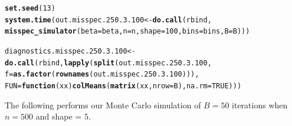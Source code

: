 \documentclass[11pt]{article}\usepackage[]{graphicx}\usepackage[]{color}
\makeatletter
\newcommand{\hlnum}[1]{\textcolor[rgb]{0.686,0.059,0.569}{#1}}%
\newcommand{\hlstd}[1]{\textcolor[rgb]{0.345,0.345,0.345}{#1}}%
\newcommand{\hlkwa}[1]{\textcolor[rgb]{0.161,0.373,0.58}{\textbf{#1}}}%
\newcommand{\hlkwb}[1]{\textcolor[rgb]{0.69,0.353,0.396}{#1}}%
\newcommand{\hlkwc}[1]{\textcolor[rgb]{0.333,0.667,0.333}{#1}}%
\newcommand{\hlkwd}[1]{\textcolor[rgb]{0.737,0.353,0.396}{\textbf{#1}}}%
\newenvironment{kframe}{%
 \def\at@end@of@kframe{}%
 \ifinner\ifhmode%
  \def\at@end@of@kframe{\end{minipage}}%
  \begin{minipage}{\columnwidth}%
 \fi\fi%
 \def\FrameCommand##1{\hskip\@totalleftmargin \hskip-\fboxsep
 \colorbox{shadecolor}{##1}\hskip-\fboxsep
     \hskip-\linewidth \hskip-\@totalleftmargin \hskip\columnwidth}%
 \MakeFramed {\advance\hsize-\width
   \@totalleftmargin\z@ \linewidth\hsize
   \@setminipage}}%
 {\par\unskip\endMakeFramed%
 \at@end@of@kframe}
\newenvironment{knitrout}{}{} %
\makeatother
\begin{document}
\begin{knitrout}
\color{fgcolor}\begin{kframe}
\begin{alltt}
\hlkwd{set.seed}\hlstd{(}\hlnum{13}\hlstd{)}
\hlkwd{system.time}\hlstd{(out.misspec.250.3.100} \hlkwb{<-} \hlkwd{do.call}\hlstd{(rbind,}
  \hlkwd{misspec_simulator}\hlstd{(}\hlkwc{beta} \hlstd{= beta,} \hlkwc{n} \hlstd{= n,} \hlkwc{shape} \hlstd{=} \hlnum{100}\hlstd{,} \hlkwc{bins} \hlstd{= bins,} \hlkwc{B} \hlstd{= B)))}
\end{alltt}


{\ttfamily\noindent\bfseries\color{errorcolor}{\#\# Error in chol.default(crossprod(x) + lambda[j] * diag(v)): the leading minor of order 5 is not positive definite}}

{\ttfamily\noindent\itshape\color{messagecolor}{\#\# Timing stopped at: 0.199 0 0.2}}\begin{alltt}
\hlstd{diagnostics.misspec.250.3.100} \hlkwb{<-} \hlkwd{do.call}\hlstd{(rbind,} \hlkwd{lapply}\hlstd{(}\hlkwd{split}\hlstd{(out.misspec.250.3.100,}
  \hlkwc{f} \hlstd{=} \hlkwd{as.factor}\hlstd{(}\hlkwd{rownames}\hlstd{(out.misspec.250.3.100))),}
  \hlkwc{FUN} \hlstd{=} \hlkwa{function}\hlstd{(}\hlkwc{xx}\hlstd{)} \hlkwd{colMeans}\hlstd{(}\hlkwd{matrix}\hlstd{(xx,} \hlkwc{nrow} \hlstd{= B),} \hlkwc{na.rm} \hlstd{=} \hlnum{TRUE}\hlstd{)))}
\end{alltt}


{\ttfamily\noindent\bfseries\color{errorcolor}{\#\# Error in split(out.misspec.250.3.100, f = as.factor(rownames(out.misspec.250.3.100))): object 'out.misspec.250.3.100' not found}}\end{kframe}
\end{knitrout}



\begin{knitrout}
\color{fgcolor}\begin{kframe}


{\ttfamily\noindent\bfseries{}}\end{kframe}
\end{knitrout}



The following performs our Monte Carlo simulation of $B = 50$ iterations 
when $n = 500$ and shape = $5$. 
\end{document}
